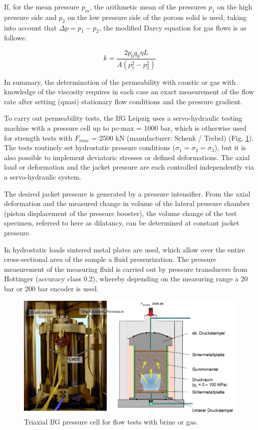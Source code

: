 If, for the mean pressure $p_m$, the arithmetic mean of the pressures $p_1$ on the high pressure side and $p_2$ on the low pressure side of the porous solid is used, taking into account that $\Delta p = p_1 - p_2$, the modified Darcy equation for gas flows is as follows:

\begin{equation}
k = \frac{2p_0q_0\eta L}{A(p_1^2-p_2^2)}
\end{equation}

In summary, the determination of the permeability with caustic or gas with knowledge of the viscosity requires in each case an exact measurement of the flow rate after setting (quasi) stationary flow conditions and the pressure gradient.

To carry out permeability tests, the IfG Leipzig uses a servo-hydraulic testing machine with a pressure cell up to pc-max = 1000 bar, which is otherwise used for strength tests with $F_{max}$ = 2500 kN (manufacturer: Schenk / Trebel) (Fig. \ref{fig:ifglabph4}). The tests routinely set hydrostatic pressure conditions ($\sigma_1 = \sigma_2 = \sigma_3$), but it is also possible to implement deviatoric stresses or defined deformations. The axial load or deformation and the jacket pressure are each controlled 
independently via a servo-hydraulic system. 

The desired jacket pressure is generated by a pressure intensifier. From the axial deformation and the measured change in volume of the lateral pressure chamber (piston displacement of the pressure booster), the volume change of the test specimen, referred to here as dilatancy, can be determined at constant jacket pressure.

In hydrostatic loads sintered metal plates are used, which allow over the entire cross-sectional area of the sample a fluid pressurization. The pressure measurement of the measuring fluid is carried out by pressure transducers from Hottinger (accuracy class 0.2), whereby depending on the measuring range a 20 bar or 200 bar encoder is used.

\begin{figure}[!ht]
\centering
\includegraphics[width=1\textwidth]{./figures/ifg-lab-photo4.png}
\caption{Triaxial IfG pressure cell for flow tests with brine or gas.}
\label{fig:ifglabph4}
\end{figure}

